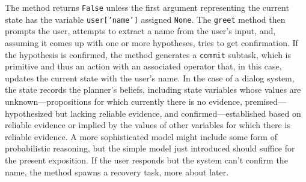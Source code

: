 \documentclass[letterpaper,11pt]{article}
\begin{document}
%
The method returns {\tt{False}} unless the first argument representing the current state has the variable {\tt{user['name']}} assigned {\tt{None}}. The {\tt{greet}} method then prompts the user, attempts to extract a name from the user's input, and, assuming it comes up with one or more hypotheses, tries to get confirmation. If the hypothesis is confirmed, the method generates a {\tt{commit}} subtask, which is primitive and thus an action with an associated operator that, in this case, updates the current state with the user's name. In the case of a dialog system, the state records the planner's beliefs, including state variables whose values are unknown---propositions for which currently there is no evidence, premised---hypothesized but lacking reliable evidence, and confirmed---established based on reliable evidence or implied by the values of other variables for which there is reliable evidence. A more sophisticated model might include some form of probabilistic reasoning, but the simple model just introduced should suffice for the present exposition. If the user responds but the system can't confirm the name, the method spawns a recovery task, more about later.
\end{document}
